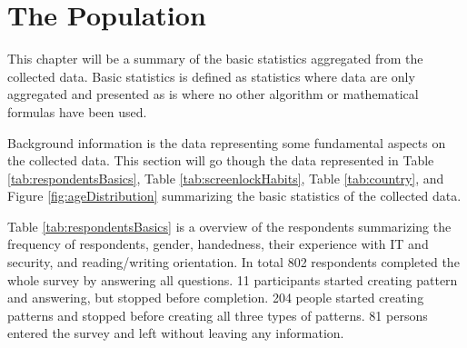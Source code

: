 \section{The Population} \label{sec:basicstatistics}

  
  This chapter will be a summary of the basic statistics aggregated from the collected data. Basic statistics is defined as statistics where data are only aggregated and presented as is where no other algorithm or mathematical formulas have been used.

  Background information is the data representing some fundamental aspects on the collected data. This section will go though the data represented in Table \ref{tab:respondentsBasics}, Table \ref{tab:screenlockHabits}, Table \ref{tab:country}, and Figure \ref{fig:ageDistribution} summarizing the basic statistics of the collected data. 

  Table \ref{tab:respondentsBasics} is a overview of the respondents summarizing the frequency of respondents, gender, handedness, their experience with IT and security, and reading/writing orientation. In total 802 respondents completed the whole survey by answering all questions. 11 participants started creating pattern and answering, but stopped before completion. 204 people started creating patterns and stopped before creating all three types of patterns. 81 persons entered the survey and left without leaving any information. 

